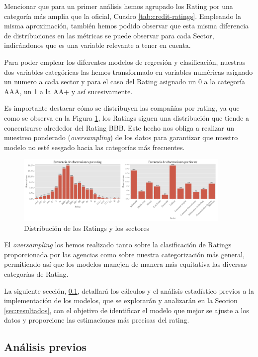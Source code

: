 \documentclass{article}
\begin{document}
Mencionar que para un primer análisis hemos agrupado los Rating por una categoría más amplia que la oficial, Cuadro \ref{tab:credit-ratings}. Empleando la misma aproximación, también hemos podido observar que esta misma diferencia de distribuciones en las métricas se puede observar para cada Sector, indicándonos que es una variable relevante a tener en cuenta. 

Para poder emplear los diferentes modelos de regresión y clasificación, nuestras dos variables categóricas las hemos transformado en variables numéricas asignado un numero a cada sector y para el caso del Rating asignado un 0 a la categoría AAA, un 1 a la AA+ y así sucesivamente.

Es importante destacar cómo se distribuyen las compañías por rating, ya que como se observa en la Figura \ref{fig:dist_rat_sec}, los Ratings siguen una distribución que tiende a concentrarse alrededor del Rating BBB. Este hecho nos obliga a realizar un muestreo ponderado (\textit{oversampling}) de los datos para garantizar que nuestro modelo no esté sesgado hacia las categorías más frecuentes.

\begin{figure}
\centering
\includegraphics[width=0.92\textwidth]{distribution_rating_sectores.png}
\caption{Distribución de los Ratings y los sectores}
\label{fig:dist_rat_sec}
\end{figure}

El \textit{oversampling} los hemos realizado tanto sobre la clasificación de Ratings proporcionada por las agencias como sobre nuestra categorización más general, permitiendo así que los modelos manejen de manera más equitativa las diversas categorías de Rating.

La siguiente sección, \ref{sec:analsis_previos}, detallará los cálculos y el análisis estadístico previos a la implementación de los modelos, que se explorarán y analizarán en la Seccion \ref{sec:resultados}, con el objetivo de identificar el modelo que mejor se ajuste a los datos y proporcione las estimaciones más precisas del rating.

\newpage
\subsection{Análisis previos}\label{sec:analsis_previos}
\end{document}
